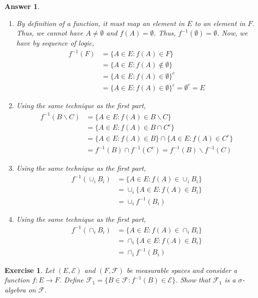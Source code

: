 \documentclass[12pt]{article}
\theoremstyle{colon}
\newtheorem{exercise}{Exercise}
\newtheorem*{answer}{Answer}
\begin{document}
\begin{answer}
  \leavevmode
  \begin{enumerate}[label=\roman*)]
    \item By definition of a function, it must map an element in $E$ to an element in $F$. Thus, we cannot have $A \neq \emptyset$ and $f(A) = \emptyset$. Thus, $f^{-1}(\emptyset) = \emptyset$. Now, we have by sequence of logic,
      \begin{align*}
        f^{-1}(F) &= \{ A \in E: f(A) \in F \} \\
        &= \{ A \in E: f(A) \notin \emptyset \} \\
        &= \{ A \in E: f(A) \in \emptyset \}^c \\
        &= \{ A \in E: f(A) \in \emptyset \}^c = \emptyset^c = E
      \end{align*}
    \item Using the same technique as the first part,
      \begin{align*}
        f^{-1}(B \backslash C) &= \{ A \in E: f(A) \in B \backslash C \} \\
        &= \{ A \in E: f(A) \in B \cap C^c \} \\
        &= \{ A \in E: f(A) \in B \} \cap \{ A \in E: f(A) \in C^c \} \\
        &= f^{-1}(B) \cap f^{-1}(C^c) = f^{-1}(B) \backslash f^{-1}(C)
      \end{align*}
    \item Using the same technique as the first part,
      \begin{align*}
        f^{-1}(\cup_i B_i) &= \{ A \in E: f(A) \in \cup_i B_i \} \\
        &= \cup_i \{ A \in E: f(A) \in B_i \} \\
        &= \cup_i f^{-1}(B_i)
      \end{align*}
    \item Using the same technique as the first part,
      \begin{align*}
        f^{-1}(\cap_i B_i) &= \{ A \in E: f(A) \in \cap_i B_i \} \\
        &= \cap_i \{ A \in E: f(A) \in B_i \} \\
        &= \cap_i f^{-1}(B_i)
      \end{align*}
  \end{enumerate}
\end{answer}

\clearpage

\begin{exercise}
  Let $(E, \mathcal{E})$ and $(F, \mathcal{F})$ be measurable spaces and consider a function $f: E \rightarrow F$. Define $\mathcal{F}_1 = \{ B \in \mathcal{F}: f^{-1}(B) \in \mathcal{E} \}$. Show that $\mathcal{F}_1$ is a $\sigma$-algebra on $\mathcal{F}$.
\end{exercise}
\end{document}
